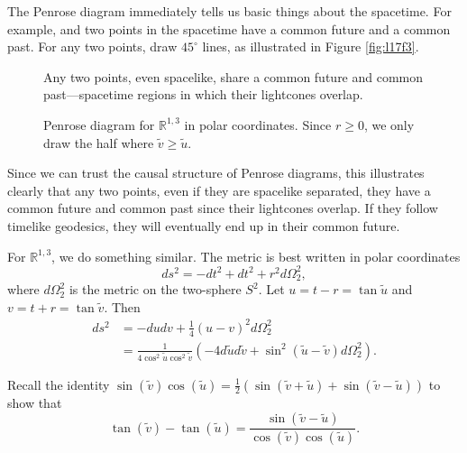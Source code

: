 The Penrose diagram immediately tells us basic things about the spacetime.
For example, and two points in the spacetime have a common future and a common past.
For any two points, draw $45^\circ$ lines, as illustrated in Figure \ref{fig:l17f3}.
\begin{figure}[tbhp]
  \centering
  \begin{minipage}[t]{0.45\columnwidth}
    \centering
    \def\svgwidth{0.9\columnwidth}
    
    \caption{Any two points, even spacelike, share a common future and common past---spacetime regions in which their lightcones overlap.}
    \label{fig:l17f3}
  \end{minipage}%
  \qquad
  \begin{minipage}[t]{0.45\columnwidth}
    \centering
    \def\svgwidth{0.65\columnwidth}
    
    \caption{Penrose diagram for $\mathbb{R}^{1, 3}$ in polar coordinates. Since $r \geq 0$, we only draw the half where $\tilde{v} \geq \tilde{u}$.}
    \label{fig:l17f4}
  \end{minipage}
\end{figure}

Since we can trust the causal structure of Penrose diagrams, this illustrates clearly that any two points, even if they are spacelike separated, they have a common future and common past since their lightcones overlap.
If they follow timelike geodesics, they will eventually end up in their common future.

For $\mathbb{R}^{1, 3}$, we do something similar.
The metric is best written in polar coordinates
\begin{equation}
  ds^2 = - dt^2 + dt^2 + r^2 d\Omega^2_2,
\end{equation}
where $d\Omega^2_2$ is the metric on the two-sphere $S^2$.
Let $u = t - r = \tan \widetilde{u}$ and $v = t + r = \tan \widetilde{v}$. Then 
\begin{align}
  ds^2 &= -du dv + \frac{1}{4} (u-v)^2 d\Omega^2_2  \\
       &= \frac{1}{4 \cos^2 \widetilde{u} \cos^2 \widetilde{v}} \left( -4 d \widetilde{u} d \widetilde{v} + \sin^2 (\widetilde{u} - \widetilde{v}) d\Omega^2_2 \right).
\end{align}
\begin{leftbar}
  \begin{note}
    Recall the identity $\sin(\tilde{v})\cos(\tilde{u}) = \frac{1}{2}(\sin(\tilde{v} + \tilde{u}) + \sin(\tilde{v} - \tilde{u}))$ to show that
    \begin{equation}
      \tan(\tilde{v}) - \tan(\tilde{u}) = \frac{\sin(\tilde{v} - \tilde{u})}{\cos(\tilde{v})\cos(\tilde{u})}.
    \end{equation}
  \end{note}
\end{leftbar}

